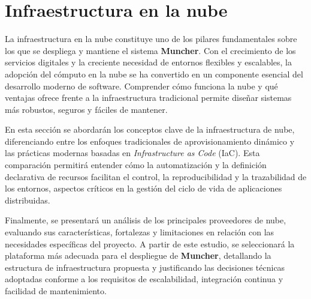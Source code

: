 \section*{Infraestructura en la nube}
{}
\label{sec:infraestructura}

La infraestructura en la nube constituye uno de los pilares fundamentales sobre los que se despliega y mantiene el sistema \textbf{Muncher}. Con el crecimiento de los servicios digitales y la creciente necesidad de entornos flexibles y escalables, la adopción del cómputo en la nube se ha convertido en un componente esencial del desarrollo moderno de software. Comprender cómo funciona la nube y qué ventajas ofrece frente a la infraestructura tradicional permite diseñar sistemas más robustos, seguros y fáciles de mantener.

En esta sección se abordarán los conceptos clave de la infraestructura de nube, diferenciando entre los enfoques tradicionales de aprovisionamiento dinámico y las prácticas modernas basadas en \textit{Infrastructure as Code} (IaC). Esta comparación permitirá entender cómo la automatización y la definición declarativa de recursos facilitan el control, la reproducibilidad y la trazabilidad de los entornos, aspectos críticos en la gestión del ciclo de vida de aplicaciones distribuidas.

Finalmente, se presentará un análisis de los principales proveedores de nube, evaluando sus características, fortalezas y limitaciones en relación con las necesidades específicas del proyecto. A partir de este estudio, se seleccionará la plataforma más adecuada para el despliegue de \textbf{Muncher}, detallando la estructura de infraestructura propuesta y justificando las decisiones técnicas adoptadas conforme a los requisitos de escalabilidad, integración continua y facilidad de mantenimiento.








